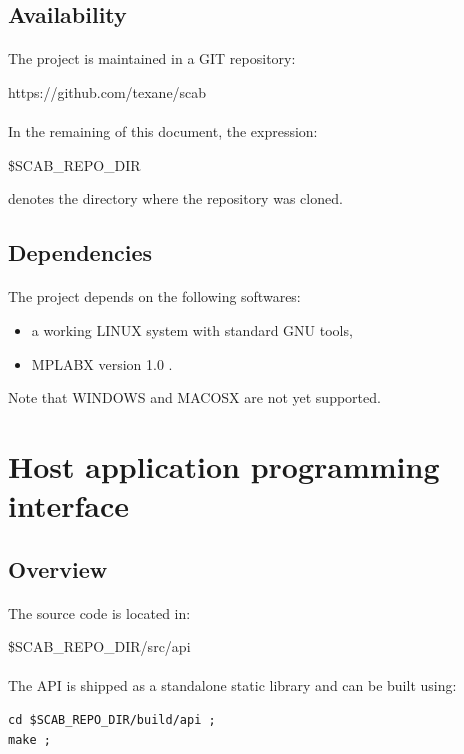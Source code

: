 \documentclass[a4paper, 11pt]{article}
\begin{document}
\subsection{Availability}
\paragraph{}
The project is maintained in a GIT repository:
\begin{center}
https://github.com/texane/scab
\end{center}
\paragraph{}
In the remaining of this document, the expression:
\begin{center}
\$SCAB\_REPO\_DIR
\end{center}
denotes the directory where the repository was cloned.

\subsection{Dependencies}
\paragraph{}
The project depends on the following softwares:
\begin{itemize}
\item a working LINUX system with standard GNU tools,
\item MPLABX version 1.0 .
\end{itemize}
Note that WINDOWS and MACOSX are not yet supported.


\newpage
\section{Host application programming interface}

\subsection{Overview}
\paragraph{}
The source code is located in:
\begin{center}
\$SCAB\_REPO\_DIR/src/api
\end{center}

\paragraph{}
The API is shipped as a standalone static library and can be built using:\\
\begin{small}
\lstset{language=C}
\begin{lstlisting}[frame=tb]
cd $SCAB_REPO_DIR/build/api ;
make ;
\end{lstlisting}
\end{small}
\end{document}
